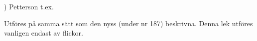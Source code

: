 \vspace{5mm}
) Petterson t.\@ ex.

\vspace{10mm}
Utföres på samma sätt som den nyss (under nr 187)
beskrivna. Denna lek utföres vanligen endast av flickor.
\vspace{5mm}
